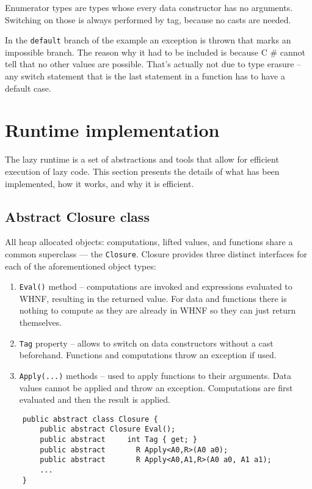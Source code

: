 \documentclass[en]{pracamgr}
\newcommand{\shrp}{%
  {\fontfamily{ppl}\selectfont\#%
  }}
\begin{document}
Enumerator types are types whose every data constructor has no arguments.
Switching on those is always performed by tag, because no casts are needed.

In the \texttt{default} branch of the example an exception is thrown that marks
an impossible branch.
The reason why it had to be included is because C\shrp{}
cannot tell that no other values are possible.
That's actually not due to type erasure -- any switch statement that
is the last statement in a function has to have a default case.

\section{Runtime implementation}\label{s:runtime_impl}

The lazy runtime is a set of abstractions and tools
that allow for efficient execution of lazy code.
This section presents the details of what has been implemented,
how it works, and why it is efficient.

\subsection{Abstract Closure class}

All heap allocated objects: computations, lifted values,
and functions share a common superclass –– the \texttt{Closure}.
Closure provides three distinct interfaces for each of the aforementioned object types:

\begin{enumerate}
    \item \texttt{Eval()} method -- computations are
    invoked and expressions evaluated to WHNF, resulting in
    the returned value. For data and functions there is
    nothing to compute as they are already in WHNF so they
    can just return themselves.
    \item \texttt{Tag} property -- allows to switch on data
    constructors without a cast beforehand. Functions and
    computations throw an exception if used.
    \item \texttt{Apply(...)} methods -- used to apply
    functions to their arguments. Data values cannot be
    applied and throw an exception. Computations are first
    evaluated and then the result is applied.
\end{enumerate}

\begin{verbatim}
    public abstract class Closure {
        public abstract Closure Eval();
        public abstract     int Tag { get; }
        public abstract       R Apply<A0,R>(A0 a0);
        public abstract       R Apply<A0,A1,R>(A0 a0, A1 a1);
        ...
    }
\end{verbatim}
\end{document}
